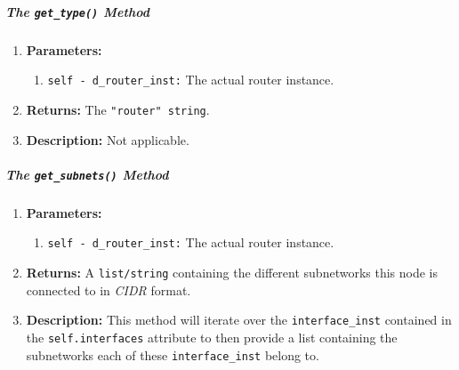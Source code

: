         \subparagraph{The \texttt{get\_type()} Method}
            \begin{enumerate}
                \item \textbf{Parameters:}
                \begin{enumerate}
                    \item \texttt{self - d\_router\_inst:} The actual router instance.
                \end{enumerate}
                \item \textbf{Returns:} The \texttt{"router" string}.
                \item \textbf{Description:} Not applicable.
            \end{enumerate}

        \subparagraph{The \texttt{get\_subnets()} Method}
            \begin{enumerate}
                \item \textbf{Parameters:}
                \begin{enumerate}
                    \item \texttt{self - d\_router\_inst:} The actual router instance.
                \end{enumerate}
                \item \textbf{Returns:} A \texttt{list/string} containing the different subnetworks this node is connected to in \textit{CIDR} format.
                \item \textbf{Description:} This method will iterate over the \texttt{interface\_inst} contained in the \texttt{self.interfaces} attribute to then provide a list containing the subnetworks each of these \texttt{interface\_inst} belong to.
            \end{enumerate}

